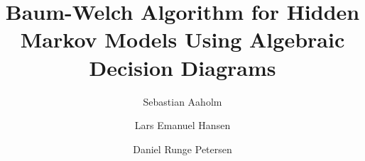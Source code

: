 




\title{Baum-Welch Algorithm for Hidden Markov Models Using Algebraic Decision Diagrams}

\author{Sebastian Aaholm 
\and Lars Emanuel Hansen 
\and Daniel Runge Petersen}

